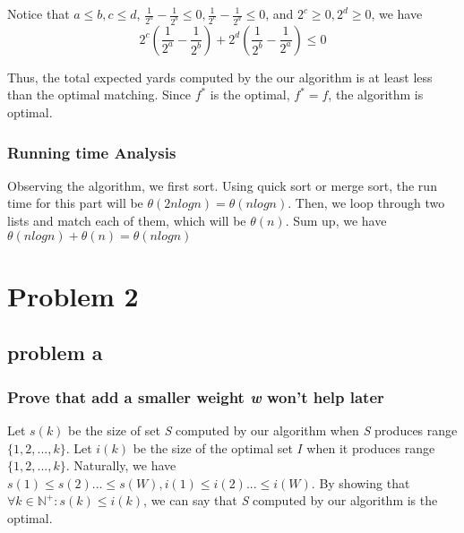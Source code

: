 \documentclass{article}
\begin{document}
        Notice that $a\leq b, c\leq d$, $\frac{1}{2^a}-\frac{1}{2^b} \leq 0, \frac{1}{2^c}-\frac{1}{2^d} \leq 0$, and $2^c \geq 0, 2^d\geq 0$, we have
        \[2^c(\frac{1}{2^a}-\frac{1}{2^b})+2^d(\frac{1}{2^b}-\frac{1}{2^a}) \leq 0\]

        Thus, the total expected yards computed by the our algorithm is at least less than the optimal matching. Since $f^*$ is the optimal, $f^* = f$, the algorithm is optimal.
        \\
        \subsubsection{Running time Analysis} 
        Observing the algorithm, we first sort. Using quick sort or merge sort, the run time for this part will be $\theta(2nlogn) = \theta(nlogn)$. Then, we loop through two lists and match each of them, which will be $\theta(n)$. Sum up, we have $\theta(nlogn)+\theta(n) = \theta(nlogn)$

\section{Problem 2}
    \subsection{problem a}
        \subsubsection{Prove that add a smaller weight \textit{w} won't help later}

        Let $s(k)$ be the size of set \textit{S} computed by our algorithm when \textit{S} produces range $\{1,2,...,k\}$. Let $i(k)$ be the size of the optimal set $I$ when it produces range $\{1,2,...,k\}$. Naturally, we have $s(1)\leq s(2)...\leq s(W), i(1)\leq i(2)...\leq i(W). $ By showing that $\forall k\in \mathbb{N}^{+}: s(k) \leq i(k)$, we can say that \textit{S} computed by our algorithm is the optimal.
        
\end{document}
